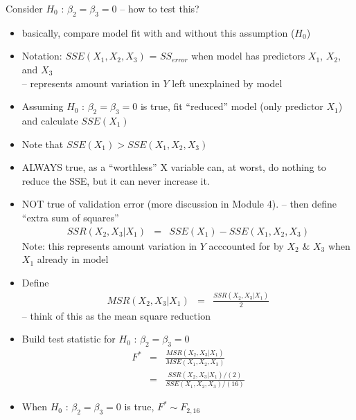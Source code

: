 \documentclass[12pt]{notes}
\begin{document}
Consider $H_0$ : $\beta_2=\beta_3=0$ -- how to test this?
\begin{itemize}
  \item basically, compare model fit with and without this
  assumption ($H_0$)
  \item Notation: $SSE(X_1,X_2,X_3)$ = $SS_{error}$ when model has
  predictors $X_1$, $X_2$, and $X_3$\\
  -- represents amount variation in $Y$ left unexplained by model
  \item Assuming $H_0$ : $\beta_2=\beta_3=0$ is true, fit
  ``reduced'' model (only predictor $X_1$) and calculate
  $SSE(X_1)$
  \item Note that $SSE(X_1) > 
  SSE(X_1,X_2,X_3)$\\
\bi
\item ALWAYS true, as a ``worthless'' X variable can, at worst, do nothing to reduce the SSE, but it can never increase it. 
\item NOT true of validation error (more discussion in Module 4). 
\ei
  -- then define ``extra sum of squares''
  \begin{eqnarray}
    SSR(X_2,X_3 | X_1) & = & SSE(X_1) - SSE(X_1,X_2,X_3) \nonumber
  \end{eqnarray}
  Note: this represents amount variation in $Y$ acccounted for by
  $X_2$ \& $X_3$ when $X_1$ already in model
  \item Define
  \begin{eqnarray}
    MSR(X_2,X_3 | X_1) & = & \frac{SSR(X_2,X_3|X_1)}{2} \nonumber
  \end{eqnarray}
  -- think of this as the mean square reduction\\ \vspace{2em}
  \item Build test statistic for $H_0$ : $\beta_2=\beta_3=0$
  \begin{eqnarray}
     F^* & = & \frac{MSR(X_2,X_3 | X_1)}{MSE(X_1,X_2,X_3)} \nonumber    \\
         & = & \frac{SSR(X_2,X_3|X_1) / (2)}{SSE(X_1,X_2,X_3) / (16)} \nonumber
  \end{eqnarray}

  \item When $H_0$ : $\beta_2=\beta_3=0$  is true, $F^* \sim
  F_{2,16}$
\end{itemize}

\newpage
\end{document}
